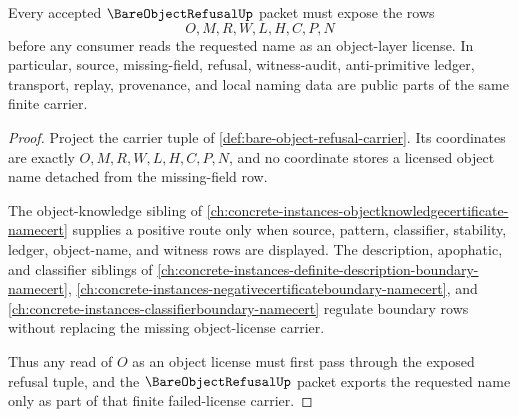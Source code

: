 \begin{theorem}
\label{thm:bare-object-refusal-obligation-carrier}
Every accepted $\BareObjectRefusalUp$ packet must expose the rows
$$
O,M,R,W,L,H,C,P,N
$$
before any consumer reads the requested name as an object-layer license. In particular, source, missing-field, refusal, witness-audit, anti-primitive ledger, transport, replay, provenance, and local naming data are public parts of the same finite carrier.
\end{theorem}
\begin{proof}
Project the carrier tuple of \autoref{def:bare-object-refusal-carrier}. Its coordinates are exactly $O,M,R,W,L,H,C,P,N$, and no coordinate stores a licensed object name detached from the missing-field row.

The object-knowledge sibling of \autoref{ch:concrete-instances-objectknowledgecertificate-namecert} supplies a positive route only when source, pattern, classifier, stability, ledger, object-name, and witness rows are displayed. The description, apophatic, and classifier siblings of \autoref{ch:concrete-instances-definite-description-boundary-namecert}, \autoref{ch:concrete-instances-negativecertificateboundary-namecert}, and \autoref{ch:concrete-instances-classifierboundary-namecert} regulate boundary rows without replacing the missing object-license carrier.

Thus any read of $O$ as an object license must first pass through the exposed refusal tuple, and the $\BareObjectRefusalUp$ packet exports the requested name only as part of that finite failed-license carrier.
\end{proof}

